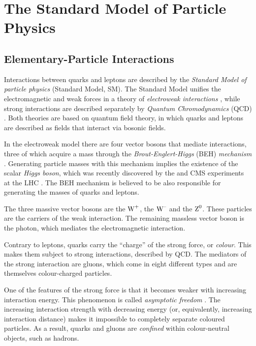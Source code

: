 \section{The Standard Model of Particle Physics}
\label{sec:intro_SM}

\subsection{Elementary-Particle Interactions}
\label{subsec:intro_SM_int}

Interactions between quarks and leptons are described by the \emph{Standard Model of particle physics} (Standard Model, SM). The Standard
Model unifies the electromagnetic and weak forces in a theory of \emph{electroweak interactions}
\cite{Glashow:1961tr,*Weinberg:1967tq,*Salam:1968rm}, while strong interactions are described separately by \emph{Quantum Chromodynamics}
(QCD) \cite{Fritzsch:1973pi}. Both theories are based on quantum field theory, in which quarks and leptons are described as fields that
interact via bosonic fields.

In the electroweak model there are four vector bosons that mediate interactions, three of which acquire a mass through the
\emph{Brout-Englert-Higgs} (BEH) \emph{mechanism} \cite{Englert:1964et,*Higgs:1964ia,*Higgs:1964pj,*Guralnik:1964eu}. Generating particle
masses with this mechanism implies the existence of the scalar \emph{Higgs boson}, which was recently discovered by the \atlas{} and
CMS experiments at the LHC \cite{Aad:2012tfa,*Chatrchyan:2012ufa}. The BEH mechanism is believed to be also responsible for generating the
masses of quarks and leptons.

The three massive vector bosons are the $\text{W}^{\text{+}}$, the $\text{W}^{\text{--}}$ and the $\text{Z}^{\text{0}}$. These particles are the carriers of the weak interaction. The
remaining massless vector boson is the photon, which mediates the electromagnetic interaction.

Contrary to leptons, quarks carry the ``charge'' of the strong force, or \emph{colour}. This makes them subject to strong interactions,
described by QCD. The mediators of the strong interaction are gluons, which come in eight different types and are themselves colour-charged
particles.

One of the features of the strong force is that it becomes weaker with increasing interaction energy. This phenomenon is called
\emph{asymptotic freedom} \cite{Gross:1973id,*Politzer:1973fx}. The increasing interaction strength with decreasing energy (or,
equivalently, increasing interaction distance) makes it impossible to completely separate coloured particles. As a result, quarks and
gluons are \emph{confined} within colour-neutral objects, such as hadrons.

